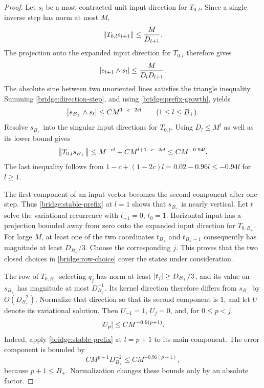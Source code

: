 \begin{proof}
Let $s_l$ be a most contracted unit input direction for $T_{0,l}$.
Since a single inverse step has norm at most $M$,
\[
 \left\lVert T_{0,l}s_{l+1}\right\rVert\leq\frac{M}{D_{l+1}}.
\]
The projection onto the expanded input direction for $T_{0,l}$
therefore gives
\begin{equation}
 \left\lvert s_{l+1}\wedge s_l\right\rvert\leq\frac{M}{D_lD_{l+1}}.
 \label{bridge:direction-step}
\end{equation}
The absolute sine between two unoriented lines satisfies the triangle
inequality. Summing \cref{bridge:direction-step}, and using
\cref{bridge:prefix-growth}, yields
\[
 \left\lvert s_{B_+}\wedge s_l\right\rvert
 \leq C M^{1-c-2cl}
 \qquad(1\leq l\leq B_+).
\]
Resolve $s_{B_+}$ into the singular input directions for $T_{0,l}$.
Using $D_l\leq M^l$ as well as its lower bound gives
\begin{equation}
 \left\lVert T_{0,l}s_{B_+}\right\rVert
 \leq M^{-cl}+C M^{l+1-c-2cl}
 \leq C M^{-0.94l}.
 \label{bridge:stable-prefix}
\end{equation}
The last inequality follows from
$1-c+(1-2c)l=0.02-0.96l\leq-0.94l$ for $l\geq1$.

The first component of an input vector becomes the second component
after one step. Thus \cref{bridge:stable-prefix} at $l=1$ shows that
$s_{B_+}$ is nearly vertical. Let $t$ solve the variational recurrence
with $t_{-1}=0$, $t_0=1$. Horizontal input has a projection bounded
away from zero onto the expanded input direction for $T_{0,B_+}$.
For large $M$, at least one of the two coordinates $t_{B_+}$ and
$t_{B_+-1}$ consequently has magnitude at least $D_{B_+}/3$.
Choose the corresponding $j$. This proves that the two closed choices
in \cref{bridge:row-choice} cover the states under consideration.

The row of $T_{0,B_+}$ selecting $q_j$ has norm at least
$\left\lvert t_j\right\rvert\geq D_{B_+}/3$, and its value on $s_{B_+}$ has magnitude
at most $D_{B_+}^{-1}$. Its kernel direction therefore differs from
$s_{B_+}$ by $O(D_{B_+}^{-2})$. Normalize that direction so that its
second component is 1, and let $U$ denote its variational solution.
Then $U_{-1}=1$, $U_j=0$, and, for $0\leq p<j$,
\begin{equation}
 \left\lvert U_p\right\rvert\leq C M^{-0.9(p+1)}.
 \label{bridge:linear-dirichlet}
\end{equation}
Indeed, apply \cref{bridge:stable-prefix} at $l=p+1$ to its main
component. The error component is bounded by
\[
 C M^{p+1}D_{B_+}^{-2}
 \leq C M^{-0.96(p+1)},
\]
because $p+1\leq B_+$. Normalization changes these bounds only by an
absolute factor.


\end{proof}
